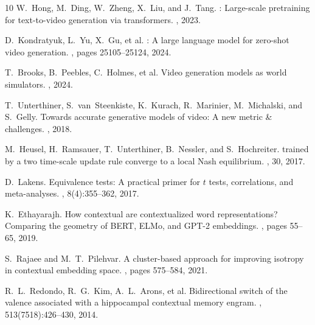 \documentclass[10pt,twocolumn,letterpaper]{article}
\begin{document}
{\begin{thebibliography}{10}
W.~Hong, M.~Ding, W.~Zheng, X.~Liu, and J.~Tang.
: Large-scale pretraining for text-to-video generation via transformers.
, 2023.

D.~Kondratyuk, L.~Yu, X.~Gu, et al.
: A large language model for zero-shot video generation.
, pages 25105--25124, 2024.

T.~Brooks, B.~Peebles, C.~Holmes, et al.
\newblock Video generation models as world simulators.
, 2024.


T.~Unterthiner, S.~van~Steenkiste, K.~Kurach, R.~Marinier, M.~Michalski, and S.~Gelly.
\newblock Towards accurate generative models of video: A new metric \& challenges.
, 2018.

M.~Heusel, H.~Ramsauer, T.~Unterthiner, B.~Nessler, and S.~Hochreiter.
 trained by a two time-scale update rule converge to a local {Nash} equilibrium.
, 30, 2017.


D.~Lakens.
\newblock Equivalence tests: A practical primer for $t$ tests, correlations, and meta-analyses.
, 8(4):355--362, 2017.


K.~Ethayarajh.
\newblock How contextual are contextualized word representations? {Comparing} the geometry of {BERT}, {ELMo}, and {GPT-2} embeddings.
, pages 55--65, 2019.

S.~Rajaee and M.~T.~Pilehvar.
\newblock A cluster-based approach for improving isotropy in contextual embedding space.
, pages 575--584, 2021.

R.~L.~Redondo, R.~G.~Kim, A.~L.~Arons, et al.
\newblock Bidirectional switch of the valence associated with a hippocampal contextual memory engram.
, 513(7518):426--430, 2014.

\end{thebibliography}
}
\end{document}
